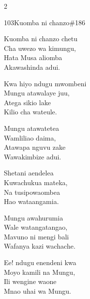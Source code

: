 \documentclass{article}
\begin{document}
\begin{multicols}{2}
\begin{hymn}{103}{Kuomba ni chanzo}{\#186}
\begin{stanza}
Kuomba ni chanzo chetu\\
Cha uwezo wa kimungu,\\
Hata Musa aliomba\\
Akawashinda adui.
\end{stanza}
\begin{stanza}
Kwa hiyo ndugu mwombeni\\
Mungu atawalaye juu,\\
Atega sikio lake\\
Kilio cha wateule.
\end{stanza}
\begin{stanza}
Mungu atawatetea\\
Wamliliao daima,\\
Atawapa nguvu zake\\
Wawakimbize adui.
\end{stanza}
\begin{stanza}
Shetani aendelea\\
Kuwachukua mateka,\\
Na tusipowaombea\\
Hao wataangamia.
\end{stanza}
\begin{stanza}
Mungu awahurumia\\
Wale watangatangao,\\
Mavuno ni mengi bali\\
Wafanya kazi wachache.
\end{stanza}
\begin{stanza}
Ee! ndugu enendeni kwa\\
Moyo kamili na Mungu,\\
Ili wengine waone\\
Mnao uhai wa Mungu.
\end{stanza}
\end{hymn}


\end{multicols}
\end{document}
